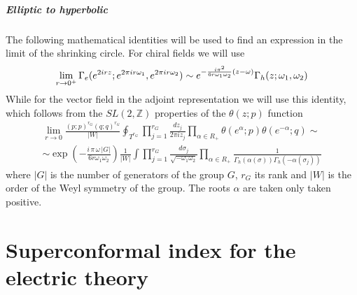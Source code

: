 \begin{appendices}
\paragraph{Elliptic to hyperbolic}
The following mathematical identities will be used to find an expression in the limit of the shrinking circle.
For chiral fields we will use \cite{vanDeBult:2007}
\begin{equation}
\lim_{r \rightarrow 0^+} \Gamma_e (e^{ 2 i r z}; e^{ 2 \pi i  r \omega_1} , e^{ 2 \pi i r  \omega_2}) \sim \\
 e^{ - \frac{ i \pi^2 }{6 r \omega_1 \omega_2 } (  z - \omega )} \Gamma_h(z;\omega_1 , \omega_2)
\end{equation}
While for the vector field in the adjoint representation we will use  this identity, which follows from the $SL(2,\mathbb{Z})$ properties of the $\theta(z;p)$ function \cite{Aharony:2013dha}
\begin{multline}
\lim_{r \rightarrow 0} \frac{ (p;p)^{r_G}(q;q)^{r_G} }{ |W| }
\oint_{T^{r_G}} \prod_{j=1}^{r_G } \frac{ d z_j}{2 \pi i z_j} \prod_{ \alpha \in R_+ }
 \theta(  e^{\alpha};p )  \theta(  e^{-\alpha};q ) 
 \sim
\\
\sim 
\exp \left(  
- \frac{ i \, \pi \, \omega \, |G|}{6 r \omega_1 \omega_2}
\right)
 \frac{1}{|W|} 
  \int 
 \prod_{j=1}^{r_G } \frac{d \sigma_j}{\sqrt{- \omega_1 \omega_2} } \prod_{\alpha \in R_+ }
 \frac{1}{\Gamma_h \left( \alpha(\sigma) \right) \Gamma_h \left( -\alpha( \sigma_j) \right) }
 \label{eqn:appendix_sl2z_theta}
\end{multline}
where $|G|$ is the number of generators of the group $G$, $r_G$ its rank and $|W |$ is the order of the Weyl symmetry of the group. 
The roots $\alpha$ are taken only taken positive.























\chapter{Superconformal index for the electric theory}
\label{appendix:index_electric}


\end{appendices}
